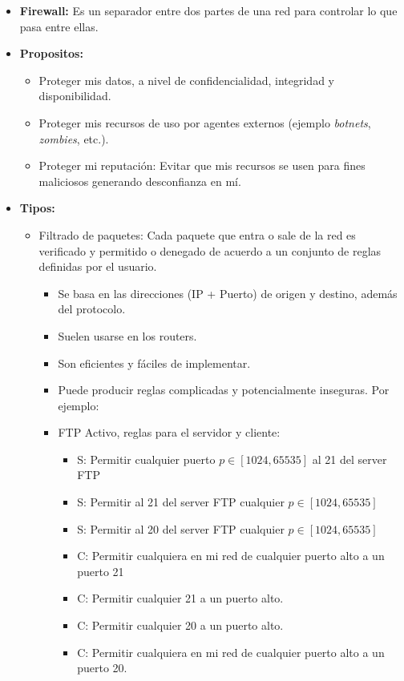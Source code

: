 \begin{itemize}
	\item \textbf{Firewall: } Es un separador entre dos partes de una red para controlar lo que pasa entre ellas. 
	\item \textbf{Propositos: }
		\begin{itemize}
			\item Proteger mis datos, a nivel de confidencialidad, integridad y disponibilidad.
			\item Proteger mis recursos de uso por agentes externos (ejemplo \textit{botnets}, \textit{zombies}, etc.).
			\item Proteger mi reputación: Evitar que mis recursos se usen para fines maliciosos generando desconfianza en mí.
		\end{itemize}
	\item \textbf{Tipos: }
		\begin{itemize}
			\item Filtrado de paquetes: Cada paquete que entra o sale de la red es verificado y permitido o denegado de acuerdo
			a un conjunto de reglas definidas por el usuario.
			\begin{itemize}
				\item Se basa en las direcciones (IP + Puerto) de origen y destino, además del protocolo.
				\item Suelen usarse en los routers.
				\item Son eficientes y fáciles de implementar.
				\item Puede producir reglas complicadas y potencialmente inseguras. Por ejemplo:
				\item FTP Activo, reglas para el servidor y cliente: \begin{itemize}
					\item S: Permitir cualquier puerto $p \in [1024,65535]$ al 21 del server FTP
					\item S: Permitir al 21 del server FTP cualquier $p \in [1024,65535]$
					\item S: Permitir al 20 del server FTP cualquier $p \in [1024,65535]$
					\item C: Permitir cualquiera en mi red de cualquier puerto alto a un puerto 21
					\item C: Permitir cualquier 21 a un puerto alto.
					\item C: Permitir cualquier 20 a un puerto alto.
					\item C: Permitir cualquiera en mi red de cualquier puerto alto a un puerto 20.
				\end{itemize}

\end{itemize}
\end{itemize}
\end{itemize}
